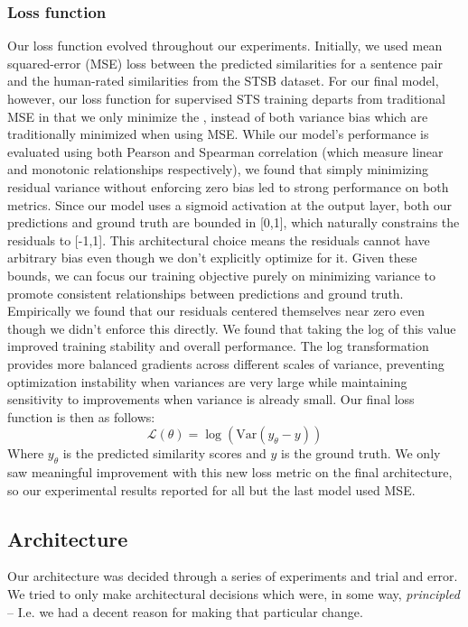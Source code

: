 \documentclass[14pt]{article}
\begin{document}
\subsubsection{Loss function}
Our loss function evolved throughout our experiments. Initially, we used mean squared-error (MSE) loss between the predicted similarities for a sentence pair and the human-rated similarities from the STSB dataset. For our final model, however, our loss function for supervised STS training departs from traditional MSE in that we only minimize the , instead of both variance  bias which are traditionally minimized when using MSE. While our model's performance is evaluated using both Pearson and Spearman correlation (which measure linear and monotonic relationships respectively), we found that simply minimizing residual variance without enforcing zero bias led to strong performance on both metrics. Since our model uses a sigmoid activation at the output layer, both our predictions and ground truth are bounded in [0,1], which naturally constrains the residuals to [-1,1]. This architectural choice means the residuals cannot have arbitrary bias even though we don't explicitly optimize for it. Given these bounds, we can focus our training objective purely on minimizing variance to promote consistent relationships between predictions and ground truth. Empirically we found that our residuals centered themselves near zero even though we didn't enforce this directly. We found that taking the log of this value improved training stability and overall performance. The log transformation provides more balanced gradients across different scales of variance, preventing optimization instability when variances are very large while maintaining sensitivity to improvements when variance is already small. Our final loss function is then as follows:
$$
\mathcal{L}(\theta) = \log(\text{Var}(y_\theta - y))
$$
Where $y_\theta$ is the predicted similarity scores and $y$ is the ground truth. We only saw meaningful improvement with this new loss metric on the final architecture, so our experimental results reported for all but the last model used MSE.

\subsection{Architecture}
Our architecture was decided through a series of experiments and trial and error. We tried to only make architectural decisions which were, in some way, \textit{principled} -- I.e. we had a decent reason for making that particular change.
\end{document}
